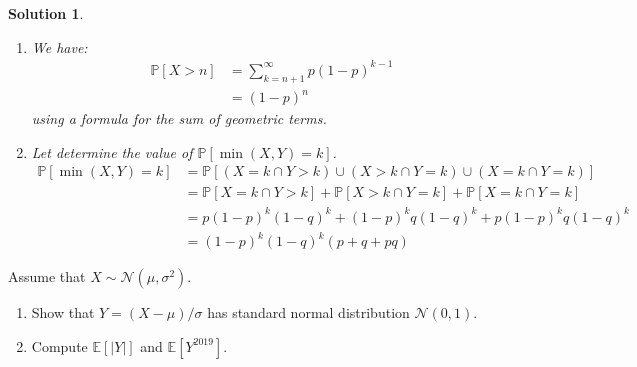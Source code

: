\documentclass{article}
\newcommand{\proba}[1]{\mathbb{P}[#1]}
\newtheorem{solution}{Solution}
\begin{document}
\begin{solution}
  \begin{enumerate}
    \item We have:
          \begin{align*}
            \proba{X > n} & = \sum_{k = n+1}^\infty p {(1-p)}^{k-1} \\
                          & = {(1-p)}^n
          \end{align*}
          using a formula for the sum of geometric terms.
    \item Let determine the value of $\proba{\min(X, Y) = k}$.
          \begin{align*}
            \proba{\min(X, Y) = k} & = \proba{(X = k \cap Y > k) \cup (X > k \cap Y = k) \cup (X = k \cap Y = k)}      \\
                                   & = \proba{X = k \cap Y > k} + \proba{X > k \cap Y = k} + \proba{X = k \cap Y = k}  \\
                                   & = p {(1-p)}^k {(1-q)}^{k} + {(1-p)}^{k} q {(1-q)}^{k} + p {(1-p)}^k q {(1-q)}^{k} \\
                                   & = {(1-p)}^k {(1-q)}^k (p + q + pq)
          \end{align*}
  \end{enumerate}
\end{solution}

\begin{Exercise} Assume that $X \sim \mathcal{N}\left(\mu, \sigma^{2}\right)$.
  \begin{enumerate}
    \item Show that $Y=(X-\mu) / \sigma$ has standard normal distribution
          $\mathcal{N}(0,1)$.
    \item Compute $\mathbb{E}[|Y|]$ and $\mathbb{E}\left[Y^{2019}\right]$.
  \end{enumerate}
\end{Exercise}
\end{document}
